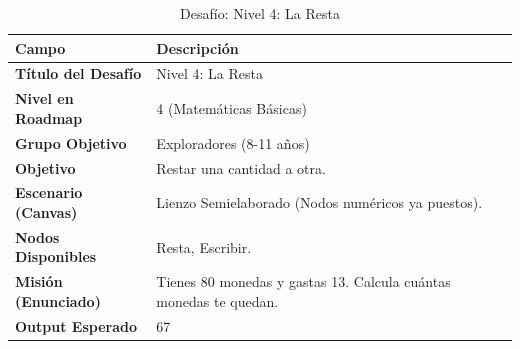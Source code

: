 \begin{table}[H]
    \centering
    \caption{Desafío: Nivel 4: La Resta}
    \label{tab:desafio-exp-4}
    \begingroup
    \renewcommand{\arraystretch}{\TableRowStretch}
    \begin{tabularx}{\textwidth}{ l X }
        \hline
        \textbf{Campo}              & \textbf{Descripción}                                              \\
        \hline
        \textbf{Título del Desafío} & Nivel 4: La Resta                                                 \\
        \textbf{Nivel en Roadmap}   & 4 (Matemáticas Básicas)                                           \\
        \textbf{Grupo Objetivo}     & Exploradores (8-11 años)                                          \\
        \textbf{Objetivo}           & Restar una cantidad a otra.                                       \\
        \textbf{Escenario (Canvas)} & Lienzo Semielaborado (Nodos numéricos ya puestos).                \\
        \textbf{Nodos Disponibles}  & Resta, Escribir.                                                  \\
        \textbf{Misión (Enunciado)} & Tienes 80 monedas y gastas 13. Calcula cuántas monedas te quedan. \\
        \textbf{Output Esperado}    & 67                                                                \\
        \hline
    \end{tabularx}
    \endgroup
\end{table}

